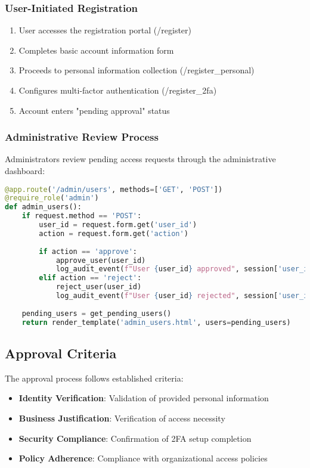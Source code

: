 \documentclass[12pt,a4paper]{article}
\begin{document}
\subsubsection{User-Initiated Registration}
\begin{enumerate}
    \item User accesses the registration portal (/register)
    \item Completes basic account information form
    \item Proceeds to personal information collection (/register\_personal)
    \item Configures multi-factor authentication (/register\_2fa)
    \item Account enters "pending approval" status
\end{enumerate}

\subsubsection{Administrative Review Process}
Administrators review pending access requests through the administrative dashboard:

\begin{lstlisting}[language=Python, caption=Administrative Approval Process]
@app.route('/admin/users', methods=['GET', 'POST'])
@require_role('admin')
def admin_users():
    if request.method == 'POST':
        user_id = request.form.get('user_id')
        action = request.form.get('action')
        
        if action == 'approve':
            approve_user(user_id)
            log_audit_event(f"User {user_id} approved", session['user_id'])
        elif action == 'reject':
            reject_user(user_id)
            log_audit_event(f"User {user_id} rejected", session['user_id'])
    
    pending_users = get_pending_users()
    return render_template('admin_users.html', users=pending_users)
\end{lstlisting}

\subsection{Approval Criteria}
The approval process follows established criteria:

\begin{itemize}
    \item \textbf{Identity Verification}: Validation of provided personal information
    \item \textbf{Business Justification}: Verification of access necessity
    \item \textbf{Security Compliance}: Confirmation of 2FA setup completion
    \item \textbf{Policy Adherence}: Compliance with organizational access policies
\end{itemize}
\end{document}

